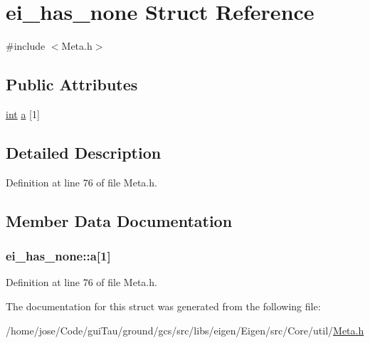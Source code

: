 \hypertarget{structei__has__none}{\section{ei\-\_\-has\-\_\-none Struct Reference}
\label{structei__has__none}
}


{\ttfamily \#include $<$Meta.\-h$>$}

\subsection*{Public Attributes}
\begin{DoxyCompactItemize}
\item 
\hyperlink{ioapi_8h_a787fa3cf048117ba7123753c1e74fcd6}{int} \hyperlink{structei__has__none_a4d45e9ca42e8ee91910b40ed410e6bec}{a} \mbox{[}1\mbox{]}
\end{DoxyCompactItemize}


\subsection{Detailed Description}


Definition at line 76 of file Meta.\-h.



\subsection{Member Data Documentation}
\hypertarget{structei__has__none_a4d45e9ca42e8ee91910b40ed410e6bec}{
\subsubsection[{a}]{ ei\-\_\-has\-\_\-none\-::a\mbox{[}1\mbox{]}}}\label{structei__has__none_a4d45e9ca42e8ee91910b40ed410e6bec}


Definition at line 76 of file Meta.\-h.



The documentation for this struct was generated from the following file\-:\begin{DoxyCompactItemize}
\item 
/home/jose/\-Code/gui\-Tau/ground/gcs/src/libs/eigen/\-Eigen/src/\-Core/util/\hyperlink{_meta_8h}{Meta.\-h}\end{DoxyCompactItemize}
